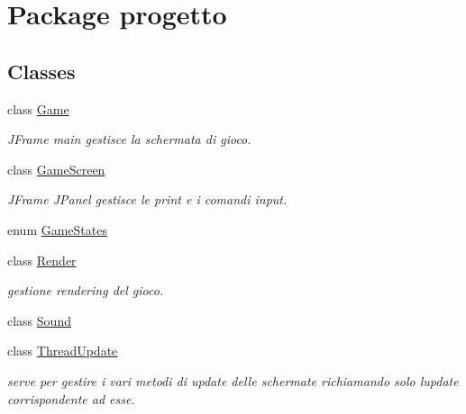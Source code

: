 \hypertarget{namespaceprogetto}{}\section{Package progetto}
\label{namespaceprogetto}
\subsection*{Classes}
\begin{DoxyCompactItemize}
\item 
class \hyperlink{classprogetto_1_1_game}{Game}
\begin{DoxyCompactList}\small\item\em J\+Frame main gestisce la schermata di gioco. \end{DoxyCompactList}\item 
class \hyperlink{classprogetto_1_1_game_screen}{Game\+Screen}
\begin{DoxyCompactList}\small\item\em J\+Frame J\+Panel gestisce le print e i comandi input. \end{DoxyCompactList}\item 
enum \hyperlink{enumprogetto_1_1_game_states}{Game\+States}
\item 
class \hyperlink{classprogetto_1_1_render}{Render}
\begin{DoxyCompactList}\small\item\em gestione rendering del gioco. \end{DoxyCompactList}\item 
class \hyperlink{classprogetto_1_1_sound}{Sound}
\item 
class \hyperlink{classprogetto_1_1_thread_update}{Thread\+Update}
\begin{DoxyCompactList}\small\item\em serve per gestire i vari metodi di update delle schermate richiamando solo l\textquotesingle{}update corrispondente ad esse. \end{DoxyCompactList}\end{DoxyCompactItemize}
